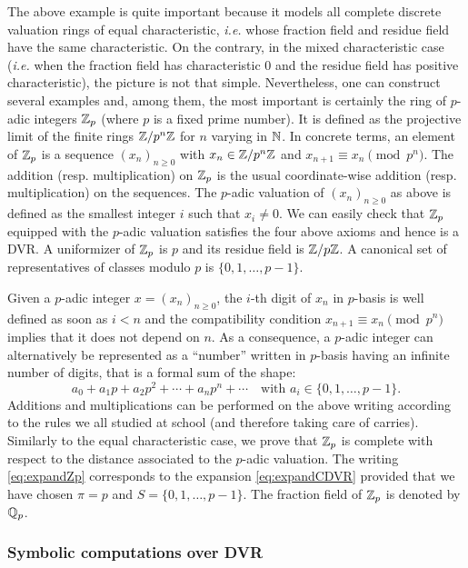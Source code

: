 \documentclass{article}
\begin{document}
The above example is quite important because it models all complete 
discrete valuation rings of equal characteristic, \emph{i.e.} whose 
fraction field and residue field have the same characteristic. On the 
contrary, in the mixed characteristic case (\emph{i.e.} when the 
fraction field has characteristic $0$ and the residue field has positive 
characteristic), the picture is not that simple.
Nevertheless, one can construct several examples and, among them, the 
most important is certainly the ring of $p$-adic integers $\mathbb Z_p$ (where 
$p$ is a fixed prime number). It is defined as the projective limit of 
the finite rings $\mathbb Z/p^n\mathbb Z$ for $n$ varying in $\mathbb N$. In concrete terms, 
an element of $\mathbb Z_p$ is a sequence $(x_n)_{n \geq 0}$ with $x_n \in 
\mathbb Z/p^n\mathbb Z$ and $x_{n+1} \equiv x_n \pmod{p^n}$. The addition (resp. 
multiplication) on $\mathbb Z_p$ is the usual coordinate-wise addition (resp. 
multiplication) on the sequences. The $p$-adic valuation of $(x_n)_{n 
\geq 0}$ as above is defined as the smallest integer $i$ such that $x_i 
\neq 0$. We can easily check that $\mathbb Z_p$ equipped with the $p$-adic 
valuation satisfies the four above axioms and hence is a DVR. A
uniformizer of $\mathbb Z_p$ is $p$ and its residue field is $\mathbb Z/p\mathbb Z$. A
canonical set of representatives of classes modulo $p$ is $\{0, 1,
\ldots, p-1\}$.

Given a $p$-adic integer $x = (x_n)_{n \geq 0}$, the $i$-th digit of 
$x_n$ in $p$-basis is well defined as soon as $i<n$ and the 
compatibility condition $x_{n+1} \equiv x_n \pmod{p^n}$ implies that 
it does not depend on $n$. As a consequence, a $p$-adic integer can 
alternatively be represented as a ``number'' written in $p$-basis having 
an infinite number of digits, that is a formal sum of the shape:
\begin{equation}
\label{eq:expandZp}
a_0 + a_1 p + a_2 p^2 + \cdots + a_n p^n + \cdots
\quad \text{with } a_i \in \{0, 1, \ldots, p-1\}.
\end{equation}
Additions and multiplications can be performed on the above writing
according to the rules we all studied at school (and therefore taking
care of carries). Similarly to the equal characteristic case, we prove
that $\mathbb Z_p$ is complete with respect to the distance associated to the 
$p$-adic valuation. The writing \eqref{eq:expandZp} corresponds to the 
expansion \eqref{eq:expandCDVR} provided that we have chosen $\pi = p$ 
and $S = \{0, 1, \ldots, p-1\}$.
The fraction field of $\mathbb Z_p$ is denoted by $\mathbb Q_p$.

\subsubsection{Symbolic computations over DVR}
\label{subsubsec:computDVR}
\end{document}
